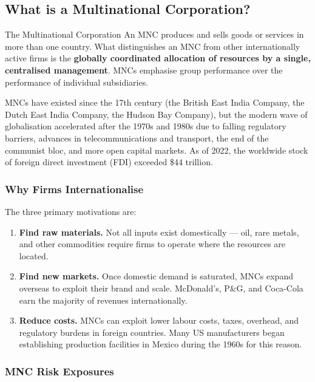 \documentclass[11pt,a4paper]{article}
\begin{document}
\subsection{What is a Multinational Corporation?}

\begin{conceptbox}{The Multinational Corporation}
An MNC produces and sells goods or services in more than one country. What distinguishes an MNC from other internationally active firms is the \textbf{globally coordinated allocation of resources by a single, centralised management}. MNCs emphasise group performance over the performance of individual subsidiaries.
\end{conceptbox}

MNCs have existed since the 17th century (the British East India Company, the Dutch East India Company, the Hudson Bay Company), but the modern wave of globalisation accelerated after the 1970s and 1980s due to falling regulatory barriers, advances in telecommunications and transport, the end of the communist bloc, and more open capital markets. As of 2022, the worldwide stock of foreign direct investment (FDI) exceeded \$44 trillion.

\subsubsection{Why Firms Internationalise}

The three primary motivations are:
\begin{enumerate}
  \item \textbf{Find raw materials.} Not all inputs exist domestically — oil, rare metals, and other commodities require firms to operate where the resources are located.
  \item \textbf{Find new markets.} Once domestic demand is saturated, MNCs expand overseas to exploit their brand and scale. McDonald's, P\&G, and Coca-Cola earn the majority of revenues internationally.
  \item \textbf{Reduce costs.} MNCs can exploit lower labour costs, taxes, overhead, and regulatory burdens in foreign countries. Many US manufacturers began establishing production facilities in Mexico during the 1960s for this reason.
\end{enumerate}

\subsubsection{MNC Risk Exposures}
\end{document}
